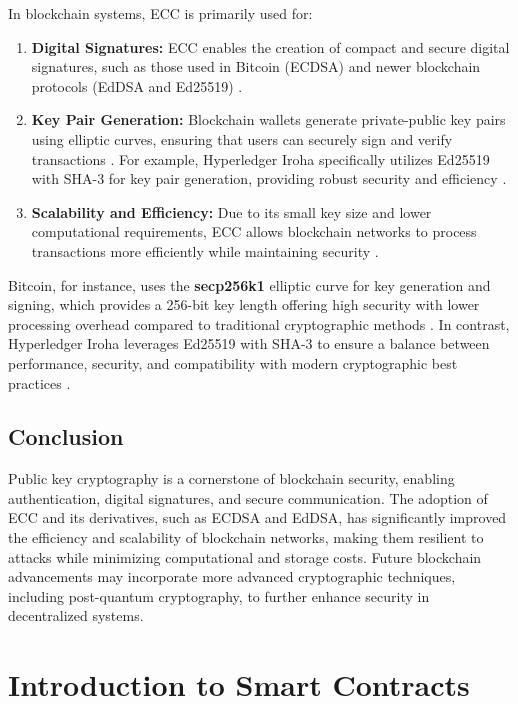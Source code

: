 \documentclass{article}
\begin{document}
In blockchain systems, ECC is primarily used for:
\begin{enumerate}
    \item \textbf{Digital Signatures:} ECC enables the creation of compact and secure digital signatures, such as those used in Bitcoin (ECDSA) and newer blockchain protocols (EdDSA and Ed25519) \cite{johnson2001elliptic, bernstein2012high}.
    \item \textbf{Key Pair Generation:} Blockchain wallets generate private-public key pairs using elliptic curves, ensuring that users can securely sign and verify transactions \cite{wu2018blockchain}. For example, Hyperledger Iroha specifically utilizes Ed25519 with SHA-3 for key pair generation, providing robust security and efficiency \cite{hyperledger_iroha}.
    \item \textbf{Scalability and Efficiency:} Due to its small key size and lower computational requirements, ECC allows blockchain networks to process transactions more efficiently while maintaining security \cite{fan2018analysis}.
\end{enumerate}

Bitcoin, for instance, uses the \textbf{secp256k1} elliptic curve for key generation and signing, which provides a 256-bit key length offering high security with lower processing overhead compared to traditional cryptographic methods \cite{brown2010standards}. In contrast, Hyperledger Iroha leverages Ed25519 with SHA-3 to ensure a balance between performance, security, and compatibility with modern cryptographic best practices \cite{hyperledger_iroha}.

\subsection*{Conclusion}
Public key cryptography is a cornerstone of blockchain security, enabling authentication, digital signatures, and secure communication. The adoption of ECC and its derivatives, such as ECDSA and EdDSA, has significantly improved the efficiency and scalability of blockchain networks, making them resilient to attacks while minimizing computational and storage costs. Future blockchain advancements may incorporate more advanced cryptographic techniques, including post-quantum cryptography, to further enhance security in decentralized systems.


\section{Introduction to Smart Contracts}
\end{document}
